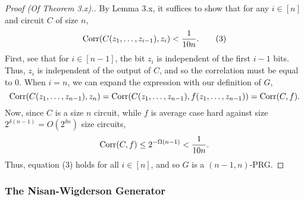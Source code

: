 \documentclass[11pt]{article}
\begin{document}
\begin{proof}[Proof \textup{(Of Theorem 3.x)}.]
    By Lemma 3.x, it suffices to show that for any $i \in [n]$ and circuit $C$ of size $n$, 
    \begin{equation*}
        \mathrm{Corr}(C(z_1, \ldots, z_{i - 1}), z_i) < \frac{1}{10 n}. \tag{3}
    \end{equation*}
    First, see that for $i \in [n - 1]$, the bit $z_i$ is independent of the first $i - 1$ bits. Thus, $z_i$ is independent of the output of $C$, and so the correlation must be equal to $0$. When $i = n$, we can expand the expression with our definition of $G$,
    \begin{equation*}
        \mathrm{Corr}(C(z_1, \ldots, z_{n - 1}), z_n) = \mathrm{Corr}(C(z_1, \ldots, z_{n - 1}), f(z_1, \ldots, z_{n - 1})) = \mathrm{Corr}(C, f).
    \end{equation*}
    Now, since $C$ is a size $n$ circuit, while $f$ is average case hard against size $2^{\delta (n - 1)} = O(2^{\delta n})$ size circuits,
    \begin{equation*}
        \mathrm{Corr}(C, f) \leq 2^{-\Omega(n - 1)} < \frac{1}{10 n}.
    \end{equation*}
    Thus, equation (3) holds for all $i \in [n]$, and so $G$ is a $(n - 1, n)$-PRG.
\end{proof}

\subsubsection{The Nisan-Wigderson Generator}
\end{document}
